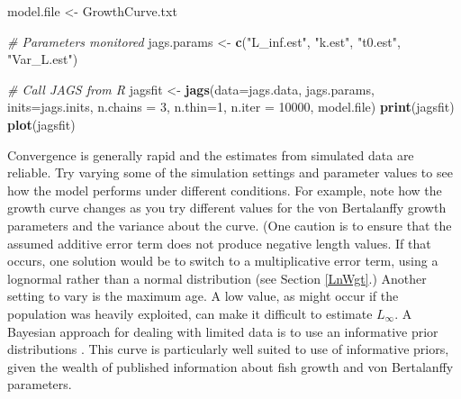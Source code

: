 \documentclass[
]{krantz}
\makeatletter
\newenvironment{Shaded}{\begin{snugshade}}{\end{snugshade}}
\newcommand{\AttributeTok}[1]{\textcolor[rgb]{0.27,0.27,0.27}{#1}}
\newcommand{\CommentTok}[1]{\textcolor[rgb]{0.37,0.37,0.37}{\textit{#1}}}
\newcommand{\DecValTok}[1]{\textcolor[rgb]{0.06,0.06,0.06}{#1}}
\newcommand{\FunctionTok}[1]{\textcolor[rgb]{0.27,0.27,0.27}{\textbf{#1}}}
\newcommand{\NormalTok}[1]{#1}
\newcommand{\OtherTok}[1]{\textcolor[rgb]{0.37,0.37,0.37}{#1}}
\newcommand{\StringTok}[1]{\textcolor[rgb]{0.5,0.5,0.5}{#1}}
\newenvironment{kframe}{%
\medskip{}
\setlength{\fboxsep}{.8em}
 \def\at@end@of@kframe{}%
 \ifinner\ifhmode%
  \def\at@end@of@kframe{\end{minipage}}%
  \begin{minipage}{\columnwidth}%
 \fi\fi%
 \def\FrameCommand##1{\hskip\@totalleftmargin \hskip-\fboxsep
 \colorbox{shadecolor}{##1}\hskip-\fboxsep
     \hskip-\linewidth \hskip-\@totalleftmargin \hskip\columnwidth}%
 \MakeFramed {\advance\hsize-\width
   \@totalleftmargin\z@ \linewidth\hsize
   \@setminipage}}%
 {\par\unskip\endMakeFramed%
 \at@end@of@kframe}
\renewenvironment{Shaded}{\begin{kframe}}{\end{kframe}}
\makeatother
\begin{document}
\begin{Shaded}
\begin{Highlighting}[]
\NormalTok{model.file }\OtherTok{\textless{}{-}} \StringTok{\textquotesingle{}GrowthCurve.txt\textquotesingle{}}

\CommentTok{\# Parameters monitored}
\NormalTok{jags.params }\OtherTok{\textless{}{-}} \FunctionTok{c}\NormalTok{(}\StringTok{"L\_inf.est"}\NormalTok{, }\StringTok{"k.est"}\NormalTok{, }\StringTok{"t0.est"}\NormalTok{, }\StringTok{"Var\_L.est"}\NormalTok{)}

\CommentTok{\# Call JAGS from R}
\NormalTok{jagsfit }\OtherTok{\textless{}{-}} \FunctionTok{jags}\NormalTok{(}\AttributeTok{data=}\NormalTok{jags.data, jags.params, }\AttributeTok{inits=}\NormalTok{jags.inits,}
                \AttributeTok{n.chains =} \DecValTok{3}\NormalTok{, }\AttributeTok{n.thin=}\DecValTok{1}\NormalTok{, }\AttributeTok{n.iter =} \DecValTok{10000}\NormalTok{,}
\NormalTok{                model.file)}
\FunctionTok{print}\NormalTok{(jagsfit)}
\FunctionTok{plot}\NormalTok{(jagsfit)}
\end{Highlighting}
\end{Shaded}

Convergence is generally rapid and the estimates from simulated data are reliable. Try varying some of the simulation settings and parameter values to see how the model performs under different conditions. For example, note how the growth curve changes as you try different values for the von Bertalanffy growth parameters and the variance about the curve. (One caution is to ensure that the assumed additive error term does not produce negative length values. If that occurs, one solution would be to switch to a multiplicative error term, using a lognormal rather than a normal distribution (see Section \ref{LnWgt}.) Another setting to vary is the maximum age. A low value, as might occur if the population was heavily exploited, can make it difficult to estimate \(L_\infty\). A Bayesian approach for dealing with limited data is to use an informative prior distributions \citep{doll.jacquemin_2018}. This curve is particularly well suited to use of informative priors, given the wealth of published information about fish growth and von Bertalanffy parameters.
\end{document}
